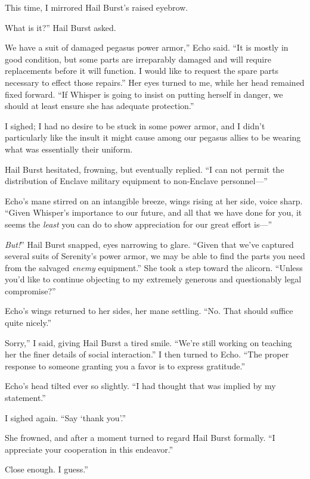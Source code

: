 This time, I mirrored Hail Burst’s raised eyebrow.

\leavevmode{}What is it?” Hail Burst asked.

\leavevmode{}We have a suit of damaged pegasus power armor,” Echo said. “It is mostly in good condition, but some parts are irreparably damaged and will require replacements before it will function. I would like to request the spare parts necessary to effect those repairs.” Her eyes turned to me, while her head remained fixed forward. “If Whisper is going to insist on putting herself in danger, we should at least ensure she has adequate protection.”

I sighed; I had no desire to be stuck in some power armor, and I didn’t particularly like the insult it might cause among our pegasus allies to be wearing what was essentially their uniform.

Hail Burst hesitated, frowning, but eventually replied. “I can not permit the distribution of Enclave military equipment to non-Enclave personnel—”

Echo’s mane stirred on an intangible breeze, wings rising at her side, voice sharp. “Given Whisper’s importance to our future, and all that we have done for you, it seems the \textit{least} you can do to show appreciation for our great effort is—”

\leavevmode{}\textit{But!}” Hail Burst snapped, eyes narrowing to glare. “Given that we’ve captured several suits of Serenity’s power armor, we may be able to find the parts you need from the salvaged \textit{enemy} equipment.” She took a step toward the alicorn. “Unless you’d like to continue objecting to my extremely generous and questionably legal compromise?”

Echo’s wings returned to her sides, her mane settling. “No. That should suffice quite nicely.”

\leavevmode{}Sorry,” I said, giving Hail Burst a tired smile. “We’re still working on teaching her the finer details of social interaction.” I then turned to Echo. “The proper response to someone granting you a favor is to express gratitude.”

Echo’s head tilted ever so slightly. “I had thought that was implied by my statement.”

I sighed again. “Say ‘thank you’.”

She frowned, and after a moment turned to regard Hail Burst formally. “I appreciate your cooperation in this endeavor.”

\leavevmode{}Close enough. I guess.”

